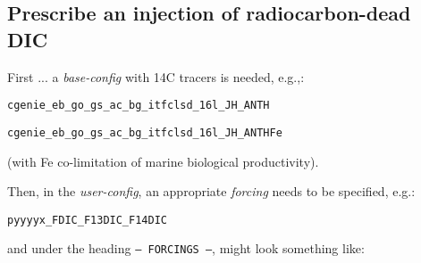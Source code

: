 \documentclass[10pt,twoside]{article}
\begin{document}

\subsection{Prescribe an injection of radiocarbon-dead DIC}\label{Prescribe a an injection of radiocarbon-dead DIC}

First ... a \textit{base-config} with 14C tracers is needed, e.g.,:
\vspace{-10pt}\begin{verbatim}
cgenie_eb_go_gs_ac_bg_itfclsd_16l_JH_ANTH
\end{verbatim}\vspace{-10pt}
\vspace{-10pt}\begin{verbatim}
cgenie_eb_go_gs_ac_bg_itfclsd_16l_JH_ANTHFe
\end{verbatim}\vspace{-10pt}
(with Fe co-limitation of marine biological productivity).

Then, in the \textit{user-config}, an appropriate \textit{forcing} needs to be specified, e.g.:
\vspace{-10pt}\begin{verbatim}
pyyyyx_FDIC_F13DIC_F14DIC
\end{verbatim}\vspace{-10pt}
and under the heading \texttt{--- FORCINGS ---}, might look something like:
 
\end{document}
